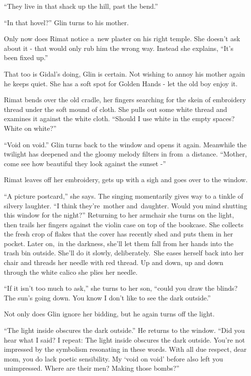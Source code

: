 \documentclass[twoside,11pt]{book}
\begin{document}
``They live in that shack up the hill,
past the bend.''

``In that hovel?'' Glin turns to his
mother.

Only now does Rimat notice a~new plaster
on his right temple. She doesn't ask about
it - that would only rub him the wrong
way. Instead she explains, ``It's been fixed up.''

That too is Gidal's doing, Glin is certain. Not wishing to annoy his
mother again he keeps quiet. She has a soft spot for Golden Hands -
 let the old boy enjoy it.

Rimat bends over the old cradle, her fingers searching for the
skein of embroidery thread under the soft mound of cloth. She pulls
out some white thread and examines it against the white cloth.
``Should I use white in the empty spaces? White on white?''

``Void on void.'' Glin turns back to the window and opens it
again. Meanwhile the twilight has deepened and the gloomy melody
filters in from~a distance. ``Mother, come see how beautiful they look
against the sunset -''

Rimat leaves off her embroidery, gets up with a sigh and goes over to
the window. 

``A picture postcard,'' she says. The singing momentarily gives way
to a tinkle of silvery laughter. ``I think they're~mother and~daughter. Would you mind shutting this window for the
night?'' Returning
to her armchair she turns on the light, then trails her fingers
against the violin case on top
of the bookcase. She
collects the fresh crop of flakes that the cover has recently shed and
puts them in her pocket. Later on,~in the darkness,
she'll let them fall from her hands into the trash bin
outside. She'll do it slowly, deliberately.~She eases herself back
into her chair and threads her needle with red thread. Up and down, up and down through the white calico she
plies her needle.

``If it isn't
too much to ask,'' she turns to her son,
``could you draw the blinds? The sun's going
down. You know I don't like to see the dark
outside.''

Not only does Glin
ignore her bidding, but he again turns off the light. 

``The light inside obscures
the dark outside.'' He returns to the window. ``Did you hear what I
said? I repeat: The light
inside obscures the dark outside. You're not impressed by the
symbolism resonating in these words. With all due respect, dear mom,
you do lack poetic sensibility. My `void on void' before also left
you unimpressed. Where are their men?
Making those bombs?''
\end{document}
